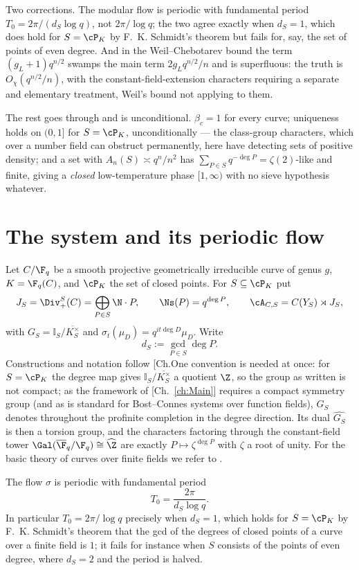 \begin{summary}
Two corrections. The modular flow is periodic with fundamental period
$T_0=2\pi/(d_S\log q)$, not $2\pi/\log q$; the two agree exactly when $d_S=1$, which does hold
for $S=\cP_K$ by F.~K. Schmidt's theorem but fails for, say, the set of points of even degree.
And in the Weil--Chebotarev bound the term $(g_L+1)q^{n/2}$ swamps the main term
$2g_Lq^{n/2}/n$ and is superfluous: the truth is $O_\chi(q^{n/2}/n)$, with the
constant-field-extension characters requiring a separate and elementary treatment, Weil's
bound not applying to them.

The rest goes through and is unconditional. $\beta_c=1$ for every curve; uniqueness holds on
$(0,1]$ for $S=\cP_K$, unconditionally --- the class-group characters, which over a number
field can obstruct permanently, here have detecting sets of positive density; and a set with
$A_n(S)\asymp q^n/n^2$ has $\sum_{P\in S}q^{-\deg P}=\zeta(2)$-like and finite, giving a
\emph{closed} low-temperature phase $[1,\infty)$ with no sieve hypothesis whatever.
\end{summary}


\section{The system and its periodic flow}

Let $C/\F_q$ be a smooth projective geometrically irreducible curve of genus $g$,
$K=\F_q(C)$, and $\cP_K$ the set of closed points. For $S\subseteq\cP_K$ put
\[
J_S=\Div_+^S(C)=\bigoplus_{P\in S}\N\cdot P,\qquad
\Ns(P)=q^{\deg P},\qquad
\cA_{C,S}=C(Y_S)\rtimes J_S,
\]
with $G_S=\mathbb I_S/\overline{K^\times_S}$ and $\sigma_t(\mu_D)=q^{it\deg D}\mu_D$. Write
\[
d_S:=\gcd_{P\in S}\deg P .
\]
Constructions and notation follow [Ch.One convention is needed at once: for $S=\cP_K$ the degree
map gives $\mathbb I_S/\overline{K^\times_S}$ a quotient $\Z$, so the group as written is
not compact; as the framework of [Ch.~\ref{ch:Main}] requires a compact symmetry group (and as is
standard for Bost--Connes systems over function fields), $G_S$ denotes throughout the
profinite completion in the degree direction. Its dual $\widehat{G_S}$ is then a torsion
group, and the characters factoring through the constant-field tower
$\Gal(\overline\F_q/\F_q)\cong\widehat\Z$ are exactly $P\mapsto\zeta^{\deg P}$ with $\zeta$
a root of unity. For the basic theory of curves over finite fields we refer to
\cite{Rosen,Stichtenoth}.

\begin{proposition}[Periodicity]\label{XVII:prop:period}
The flow $\sigma$ is periodic with fundamental period
\[
T_0=\frac{2\pi}{d_S\log q}.
\]
In particular $T_0=2\pi/\log q$ precisely when $d_S=1$, which holds for $S=\cP_K$ by
F.~K. Schmidt's theorem \cite{Rosen} that the gcd of the degrees of closed points of a curve over a finite
field is $1$; it fails for instance when $S$ consists of the points of even degree, where
$d_S=2$ and the period is halved.
\end{proposition}

